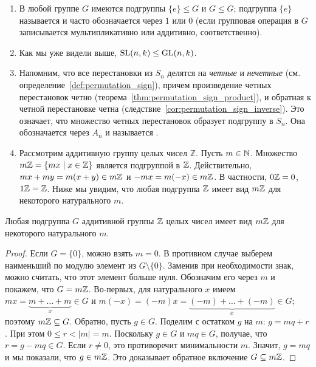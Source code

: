 \begin{examples}
\begin{enumerate}
\item В любой группе $G$ имеются подгруппы $\{e\}\leq G$ и $G\leq G$;
  подгруппа $\{e\}$ называется
   и часто обозначается
  через $1$ или $0$ (если групповая операция в $G$ записывается
  мультипликативно или аддитивно, соответственно).
\item Как мы уже видели выше, $\operatorname{SL}(n,k)\leq\operatorname{GL}(n,k)$.
\item Напомним, что все перестановки из $S_n$ делятся на {\em четные}
  и {\em нечетные} (см. определение~\ref{def:permutation_sign}),
  причем произведение четных перестановок четно
  (теорема~\ref{thm:permutation_sign_product}), и обратная к четной
  перестановке четна
  (следствие~\ref{cor:permutation_sign_inverse}). Это означает, что
  множество четных перестановок образует подгруппу в $S_n$. Она
  обозначается через $A_n$ и называется .
\item Рассмотрим аддитивную группу целых чисел $\mathbb Z$. Пусть
  $m\in\mathbb N$. Множество $m\mathbb Z = \{mx\mid x\in\mathbb Z\}$ является
  подгруппой в $\mathbb Z$. Действительно, $mx+my = m(x+y)\in m\mathbb Z$ и
  $-mx = m(-x)\in m\mathbb Z$. В частности, $0\mathbb Z = 0$, $1\mathbb Z = \mathbb
  Z$.
  Ниже мы увидим, что любая подгруппа $\mathbb Z$
  имеет вид $m\mathbb Z$ для некоторого натурального $m$.
\end{enumerate}
\end{examples}

\begin{theorem}\label{thm:subgroups_of_z}
Любая подгруппа $G$ аддитивной группы $\mathbb Z$ целых чисел имеет вид
$m\mathbb Z$ для некоторого натурального $m$.
\end{theorem}
\begin{proof}
Если $G=\{0\}$, можно взять $m=0$. В противном случае выберем
наименьший по модулю элемент из $G\setminus\{0\}$. Заменив при
необходимости знак, можно считать, что этот элемент больше
нуля. Обозначим его через $m$ и покажем, что $G = m\mathbb Z$. Во-первых,
для натурального $x$ имеем $mx = \underbrace{m+\dots+m}_{x}\in G$ и
$m(-x) = (-m)x = \underbrace{(-m) + \dots + (-m)}_{x}\in G$; поэтому
$m\mathbb Z\subseteq G$. Обратно, пусть $g\in G$. Поделим с остатком $g$
на $m$: $g = mq + r$. При этом $0\leq r < |m| = m$. Поскольку $g\in G$
и $mq\in G$, получае, что $r = g - mq\in G$. Если $r\neq 0$, это
противоречит минимальности $m$. Значит, $g = mq$ и мы показали, что
$g\in m\mathbb Z$. Это доказывает обратное включение $G\subseteq m\mathbb Z$.
\end{proof}

